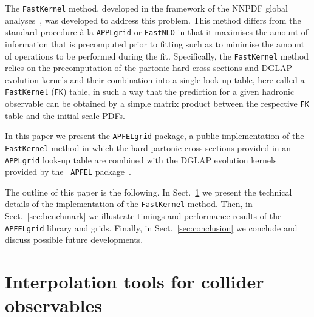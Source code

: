 \documentclass[preprint,12pt]{elsarticle}
\begin{document}
The {\tt FastKernel} method, developed in the framework of
the NNPDF global analyses~\cite{Ball:2010de}, was developed to address
this problem. This method differs from the standard procedure \`{a} la {\tt APPLgrid} or {\tt FastNLO} in that it
maximises the amount of information that is precomputed prior to fitting such as to minimise the amount
of operations to be performed during the fit. Specifically, the {\tt FastKernel} method relies on the precomputation
of the partonic hard cross-sections and DGLAP evolution kernels
and their combination into a single look-up table, here called a {\tt FastKernel} ({\tt FK}) table, in such a way that the prediction for a given hadronic
observable can be obtained by a simple matrix product between
the respective {\tt FK} table and the initial scale PDFs.

In this paper we present the {\tt APFELgrid} package, a public
implementation of the {\tt FastKernel} method in which the hard
partonic cross sections provided in an {\tt APPLgrid} look-up table
are combined with the DGLAP evolution kernels provided by the {\tt
  APFEL}
package~\cite{Bertone:2013vaa,Carrazza:2014gfa,Bertone:2015cwa,Bertone:2015lqa,Carrazza:2015dea,Bertone:2015gba}.

The outline of this paper is the following. In
Sect.~\ref{sec:FastKernel} we present the technical details of the
implementation of the {\tt FastKernel} method. Then, in
Sect.~\ref{sec:benchmark} we illustrate timings and performance
results of the {\tt APFELgrid} library and grids. Finally, in
Sect.~\ref{sec:conclusion} we conclude and discuss possible future
developments.

\section{Interpolation tools for collider observables}\label{sec:FastKernel}
\end{document}
